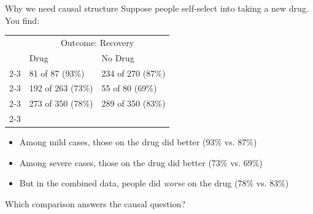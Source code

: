 \documentclass[xcolor=dvipsnames]{beamer}
\begin{document}
\begin{frame}{Why we need causal structure}
\normalsize
{} Suppose people self-select into taking a new drug. You find: \\
\pause
\begin{table}[]
\begin{tabular}{lll}
                              & \multicolumn{2}{c}{Outcome:  Recovery}                                                                  \\
                              & Drug                                               & No Drug                                            \\ \cline{2-3}
\multicolumn{1}{l|}{Mild}     & \multicolumn{1}{l|}{81 of 87 (93\%)}   & \multicolumn{1}{l|}{234 of 270  (87\%)} \\ \cline{2-3}
\multicolumn{1}{l|}{Severe}   & \multicolumn{1}{l|}{192 of 263 (73\%)} & \multicolumn{1}{l|}{55 of 80  (69\%)}   \\ \cline{2-3}
\multicolumn{1}{l|}{Combined} & \multicolumn{1}{l|}{273 of 350 (78\%)}  & \multicolumn{1}{l|}{289 of 350 (83\%)} \\ \cline{2-3}
\end{tabular}
\end{table}

\small
\begin{itemize}
\item<3-> Among mild cases, those on the drug did better (93\% vs. 87\%)
\item<4-> Among severe cases, those on the drug did better (73\% vs. 69\%)
\item<5-> But in the combined data, people did \textit{worse} on the drug (78\% vs. 83\%)
\end{itemize}
 Which comparison answers the causal question?
\end{frame}
\end{document}
